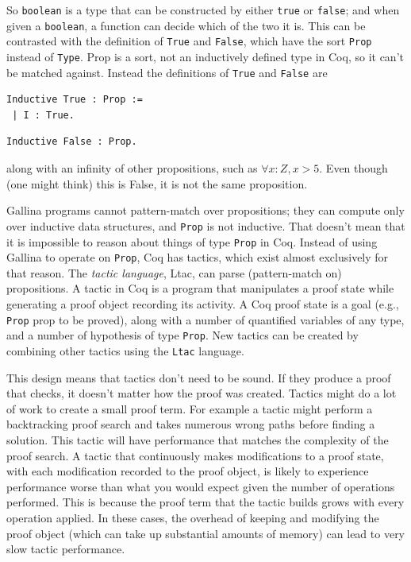 \documentclass{puthesis}
\begin{document}
So \lstinline|boolean| is a type that can be constructed by either
\lstinline|true| or \lstinline|false|; and when given a
\lstinline|boolean|, a function can decide which of the two it is. 
This can be contrasted with the definition of \lstinline|True| and
\lstinline|False|, which have the sort \lstinline|Prop| instead of
\lstinline|Type|.
Prop is a sort, not an inductively defined type in Coq, so it can't be matched
against. Instead the definitions of \lstinline|True| and \lstinline|False|
are

\begin{lstlisting}
Inductive True : Prop := 
 | I : True.
\end{lstlisting}
\begin{lstlisting}
Inductive False : Prop.
\end{lstlisting}

\noindent along with an infinity of other propositions, such as
$\forall x:Z, x>5$.  Even though (one might think) this is False, it is not
the same proposition.

\noindent 
Gallina programs cannot pattern-match over propositions; they can
compute only over inductive data structures, and \lstinline|Prop| is not
inductive. That doesn't mean that it is impossible to reason about
things of type \lstinline|Prop| in Coq. Instead of using Gallina to
operate on \lstinline|Prop|, Coq has tactics, which exist almost
exclusively for that reason. The \emph{tactic language}, Ltac, can parse
(pattern-match on) propositions. A tactic in Coq is a program that
manipulates a proof state while generating a proof object recording
its activity. A Coq proof state is a goal (e.g., \lstinline|Prop| prop
to be proved), along with a number of quantified variables of any
type, and a number of hypothesis of type \lstinline|Prop|. New tactics
can be created by combining other tactics using the \lstinline|Ltac| language.

This design means that tactics don't need to be sound. If they produce
a proof that checks, it doesn't matter how the proof was
created. Tactics might do a lot of work to create a small proof
term. For example a tactic might perform a backtracking proof search
and takes numerous wrong paths before finding a solution. This tactic
will have performance that matches the complexity of the proof
search. A tactic that continuously makes modifications to a proof
state, with each modification recorded to the proof object, is likely
to experience performance worse than what you would expect given the
number of operations performed. This is because the proof term that
the tactic builds grows with every operation applied. In these cases,
the overhead of keeping and modifying the proof object (which can take
up substantial amounts of memory) can lead to very slow tactic
performance.
\end{document}
